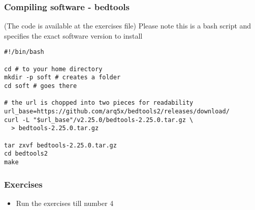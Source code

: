 \documentclass{beamer}
\begin{document}







\begin{frame}[fragile]
  \frametitle{Compiling software -  bedtools}
  (The code is available at the exercises file)
Please note this is a bash script and specifies the exact software version to install

   \begin{small}
\begin{verbatim}
#!/bin/bash

cd # to your home directory
mkdir -p soft # creates a folder
cd soft # goes there

# the url is chopped into two pieces for readability
url_base=https://github.com/arq5x/bedtools2/releases/download/
curl -L "$url_base"/v2.25.0/bedtools-2.25.0.tar.gz \
  > bedtools-2.25.0.tar.gz

tar zxvf bedtools-2.25.0.tar.gz
cd bedtools2
make
\end{verbatim}
  \end{small}
\end{frame}


\begin{frame}
  \frametitle{Exercises}
  \begin{itemize}
  \item Run the exercises till number 4
  \end{itemize}
\end{frame}
\end{document}
